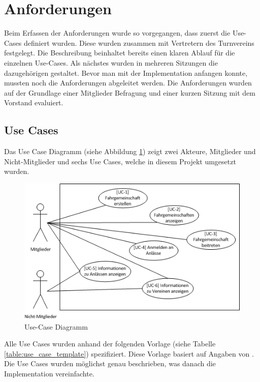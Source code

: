 \newpage
\section{Anforderungen}\label{sec.anfoderungen}
Beim Erfassen der Anforderungen wurde so vorgegangen, dass zuerst die Use-Cases definiert wurden. Diese wurden zusammen mit Vertretern des Turnvereins festgelegt. Die Beschreibung beinhaltet bereits einen klaren Ablauf für die einzelnen Use-Cases. Als nächstes wurden in mehreren Sitzungen die dazugehörigen  gestaltet. Bevor man mit der Implementation anfangen konnte, mussten noch die Anforderungen abgeleitet werden. Die Anforderungen wurden auf der Grundlage einer Mitglieder Befragung und einer kurzen Sitzung mit dem Vorstand evaluiert.

\subsection{Use Cases}\label{use_cases}
Das Use Case Diagramm (siehe Abbildung \ref{fig:use_case}) zeigt zwei Akteure, Mitglieder und Nicht-Mitglieder und sechs Use Cases, welche in diesem Projekt umgesetzt wurden.
\begin{figure}[h]
\includegraphics{images/anforderungen/use_cases.png}
\caption{Use-Case Diagramm}
\label{fig:use_case}
\end{figure}

Alle Use Cases wurden anhand der folgenden Vorlage (siehe Tabelle \ref{table:use_case_template}) spezifiziert. Diese Vorlage basiert auf Angaben von \cite{req_eng_book}. Die Use Cases wurden möglichst genau beschrieben, was danach die Implementation vereinfachte.

